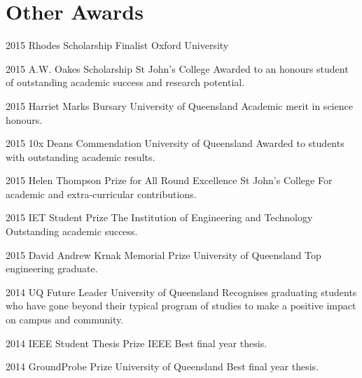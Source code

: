 \section{Other Awards}
\begin{entrylist}
	\entryInlineSmall
	{2015}
	{Rhodes Scholarship Finalist}
	{Oxford University}
	{}
\end{entrylist}
\begin{entrylist}
	\entryInlineSmall
	{2015} %
	{A.W. Oakes Scholarship}
	{St John's College}
	{Awarded to an honours student of outstanding academic success and research potential.}
\end{entrylist}
\begin{entrylist}
	\entryInline
	{2015} %
	{Harriet Marks Bursary}
	{University of Queensland}
	{Academic merit in science honours.}
\end{entrylist}
\begin{entrylist}
	\entryInlineSmall
	{2015}
	{10x Deans Commendation}
	{University of Queensland}
	{Awarded to students with outstanding academic results.}
\end{entrylist}
\begin{entrylist}
	\entryInlineSmall
	{2015}
	{Helen Thompson Prize for All Round Excellence}
	{St John's College}
	{For academic and extra-curricular contributions.}
\end{entrylist}
\begin{entrylist}
	\entryInline
	{2015} %
	{IET Student Prize}
	{The Institution of Engineering and Technology}
	{Outstanding academic success.}
\end{entrylist}
\begin{entrylist}
	\entryInline
	{2015} %
	{David Andrew Krnak Memorial Prize}
	{University of Queensland}
	{Top engineering graduate.}
\end{entrylist}
\begin{entrylist}
	\entryInlineSmall
	{2014} %
	{UQ Future Leader}
	{University of Queensland}
	{Recognises graduating students who have gone beyond their typical program of studies to make a positive impact on campus and community.}
\end{entrylist}
\begin{entrylist}
	\entryInline
	{2014} %
	{IEEE Student Thesis Prize}
	{IEEE}
	{Best final year thesis.}
\end{entrylist}
\begin{entrylist}
	\entryInline
	{2014}
	{GroundProbe Prize}
	{University of Queensland}
	{Best final year thesis.} %
\end{entrylist}
